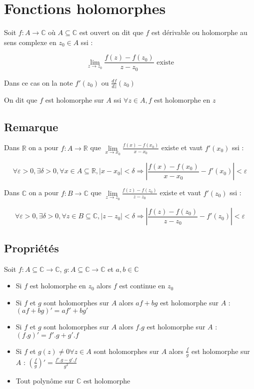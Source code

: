 \documentclass[a4paper,10pt]{report}
\newcommand{\ap}{\rightarrow}
\newcommand{\R}{\mathbb{R}}
\newcommand{\C}{\mathbb{C}}
\newcommand{\so}{\Rightarrow}
\newcommand{\abs}[1]{\left\vert #1 \right\vert}
\newcommand{\clim}[1]{\lim\limits_{#1}}
\begin{document}

\section{Fonctions holomorphes}

Soit $f: A \ap \C$ où $A \subseteq \C$ est ouvert on dit que $f$ est
dérivable ou holomorphe au sens complexe en $z_0 \in A$ ssi :

\[ \clim{z \ap z_0} \frac{f(z) - f(z_0)}{z-z_0} \mbox{ existe}\]

Dans ce cas on la note $f'(z_0)$ ou $\frac{df}{dz}(z_0)$

On dit que $f$ est holomorphe sur $A$ ssi $\forall z \in A, f$ est holomorphe
en $z$

\subsection{Remarque}

Dans $\R$ on a pour $f: A \ap \R$ que $\clim{x \ap x_0} \frac{f(x) - f(x_0)}{x
- x_0}$ existe et vaut $f'(x_0)$ ssi :

\[ \forall \varepsilon > 0, \exists \delta >0 , \forall x \in A \subseteq
\R, \abs{x - x_0} < \delta \so \abs{\frac{f(x)-f(x_0)}{x-x_0} - f'(x_0)} <
\varepsilon \]

Dans $\C$ on a pour $f: B \ap \C$ que $\clim{z \ap z_0} \frac{f(z) - f(z_0)}{z
- z_0}$ existe et vaut $f'(z_0)$ ssi :

\[ \forall \varepsilon > 0, \exists \delta >0 , \forall z \in B \subseteq
\C, \abs{z - z_0} < \delta \so \abs{\frac{f(z)-f(z_0)}{z-z_0} - f'(z_0)} <
\varepsilon \]

\subsection{Propriétés}

Soit $f : A \subseteq \C \ap \C$, $g : A \subseteq \C \ap \C$ et $a,b \in \C$

\begin{itemize}
\item{Si $f$ est holomorphe en $z_0$ alors $f$ est continue en $z_0$}
\item{Si $f$ et $g$ sont holomorphes sur $A$ alors $af + bg$ est holomorphe sur $A$ : $(af + bg)' = af' + bg'$}
\item{Si $f$ et $g$ sont holomorphes sur $A$ alors $f.g$ est holomorphe sur $A$ : $(f.g)' = f'.g + g'.f$}
\item{Si $f$ et $g(z) \neq 0 \forall z \in A$ sont holomorphes sur $A$ alors $\frac{f}{g}$ est holomorphe sur $A$ : $\left(\frac{f}{g}\right)' = \frac{f'.g - g'.f}{g^2}$}
\item{Tout polynôme sur $\C$ est holomorphe}
\end{itemize}
\end{document}
